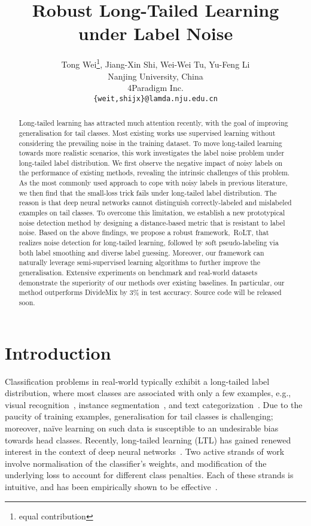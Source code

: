\documentclass{article}
\title{Robust Long-Tailed Learning under Label Noise}
\author{
    Tong Wei\thanks{equal contribution}, \quad Jiang-Xin Shi\footnotemark[1], \quad Wei-Wei Tu, \quad Yu-Feng Li \\
    Nanjing University, China \\
    4Paradigm Inc. \\
    \texttt{\{weit,shijx\}@lamda.nju.edu.cn}\\
}
\def\algo{{\textsc{RoLT}}}
\begin{document}
\maketitle

\begin{abstract}
Long-tailed learning has attracted much attention recently, with the goal of improving generalisation for tail classes. Most existing works use supervised learning without considering the prevailing noise in the training dataset. To move long-tailed learning towards more realistic scenarios, this work investigates the label noise problem under long-tailed label distribution. We first observe the negative impact of noisy labels on the performance of existing methods, revealing the intrinsic challenges of this problem. As the most commonly used approach to cope with noisy labels in previous literature, we then find that the small-loss trick fails under long-tailed label distribution. The reason is that deep neural networks cannot distinguish correctly-labeled and mislabeled examples on tail classes. To overcome this limitation, we establish a new prototypical noise detection method by designing a distance-based metric that is resistant to label noise. Based on the above findings, we propose a robust framework,~\algo, that realizes noise detection for long-tailed learning, followed by soft pseudo-labeling via both label smoothing and diverse label guessing. Moreover, our framework can naturally leverage semi-supervised learning algorithms to further improve the generalisation. Extensive experiments on benchmark and real-world datasets demonstrate the superiority of our methods over existing baselines. In particular,
our method outperforms DivideMix by 3\% in test accuracy. Source code will be released soon. \end{abstract}



\section{Introduction}

Classification problems in real-world typically exhibit a long-tailed label distribution, where most classes are associated with only a few examples, e.g., visual recognition~\cite{DBLP:conf/cvpr/HornASCSSAPB18,DBLP:conf/cvpr/0002MZWGY19,DBLP:conf/cvpr/TanWLLOYY20}, instance segmentation~\cite{DBLP:conf/cvpr/GuptaDG19}, and text categorization~\cite{weit2020tnnls}. Due to the paucity of training examples, generalisation for tail classes is challenging; moreover, naïve learning on such data is susceptible to an undesirable bias towards head classes. Recently, long-tailed learning (LTL) has gained renewed interest in the context of deep neural networks~\cite{DBLP:conf/nips/WangRH17,DBLP:conf/nips/CaoWGAM19ldam,DBLP:conf/cvpr/CuiJLSB19,DBLP:conf/iclr/KangXRYGFK20,DBLP:conf/eccv/WuH0WL20,DBLP:conf/nips/YangX20rethinking,DBLP:journals/corr/abs-2104-02703,wang2021diverse}. Two active strands of work involve normalisation of the classifier's weights, and modification of the underlying loss to account for different class penalties. Each of these strands is intuitive, and has been empirically shown to be effective~\cite{menon2021logitadjust}. 
\end{document}
